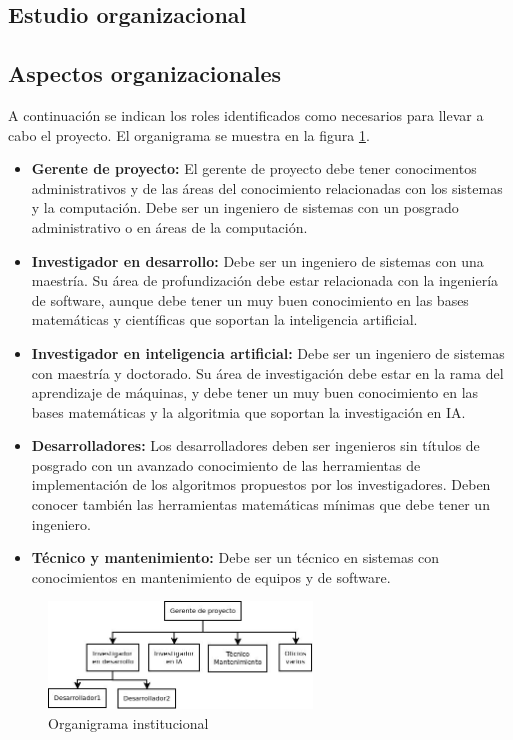 \documentclass[a4paper, 12pt, oneside]{article}
\begin{document}
	\begin{center}
	\section{Estudio organizacional}
	\end{center}
	
	\subsection{Aspectos organizacionales}

	A continuación se indican los roles identificados como necesarios para llevar a cabo el proyecto. El organigrama se muestra en la figura \ref{fig:org}.
	\begin{itemize}
		\item {\bf Gerente de proyecto:} El gerente de proyecto debe tener conocimentos administrativos y de las áreas del conocimiento relacionadas con los sistemas y la computación. Debe ser un ingeniero de sistemas con un posgrado administrativo o en áreas de la computación.
		\item {\bf Investigador en desarrollo:} Debe ser un ingeniero de sistemas con una maestría. Su área de profundización debe estar relacionada con la ingeniería de software, aunque debe tener un muy buen conocimiento en las bases matemáticas y científicas que soportan la inteligencia artificial.
		\item {\bf Investigador en inteligencia artificial:} Debe ser un ingeniero de sistemas con maestría y doctorado. Su área de investigación debe estar en la rama del aprendizaje de máquinas, y debe tener un muy buen conocimiento en las bases matemáticas y la algoritmia que soportan la investigación en IA.
		\item {\bf Desarrolladores:} Los desarrolladores deben ser ingenieros sin títulos de posgrado con un avanzado conocimiento de las herramientas de implementación de los algoritmos propuestos por los investigadores. Deben conocer también las herramientas matemáticas mínimas que debe tener un ingeniero.
		\item {\bf Técnico y mantenimiento:} Debe ser un técnico en sistemas con conocimientos en mantenimiento de equipos y de software.
	\end{itemize}	
	
	\begin{figure}
	\begin{center}
	\leavevmode
	\includegraphics[width=7cm]{img/org.jpg}
	\end{center}
	\caption{Organigrama institucional}
	\label{fig:org}
	\end{figure}
	
\end{document}
